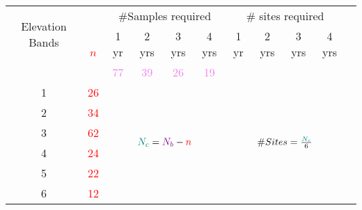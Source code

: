 \begin{table}\scriptsize
\centering
\begin{tabular}{cccccc|ccccc}
\toprule
 \multirow{2}{1cm}{Elevation Bands}  &   &\multicolumn{4}{c|}{ \#Samples required} & \multicolumn{4}{c}{\# sites required} \\ \cline{3-10}\noalign{\smallskip}
\multicolumn{1}{c}{}&\multirow{2}{.3cm}{\textcolor{red}{$n$}}  & 1 yr  & 2 yrs   & 3 yrs    & 4 yrs                   & 1 yr   & 2 yrs  & 3 yrs  & 4 yrs\\ 
						&		           &\textcolor{violet}{77} &\textcolor{violet}{39} &\textcolor{violet}{26} &\textcolor{violet}{19}&&&&&\\ \midrule				
1   &\textcolor{red}{26}&\multicolumn{4}{c|}{\multirow{6}{*}{\large$\textcolor{teal}{N_c}={\textcolor{violet}{N_b} - \textcolor{red}{n}}$}}& \multicolumn{4}{c}{\multirow{6}{*}{\large$\#Sites = {\textcolor{teal}{N_c}\over 6}$}}                                                               \\ 
2     &\textcolor{red}{34}&\multicolumn{4}{c|}{}&\multicolumn{4}{c}{}                                                              \\ 
3    &\textcolor{red}{62}&\multicolumn{4}{c|}{}   &\multicolumn{4}{c}{}                                                                 \\
4     &\textcolor{red}{24}&\multicolumn{4}{c|}{}   &\multicolumn{4}{c}{}                                                             \\ 
5     &\textcolor{red}{22}&\multicolumn{4}{c|}{}    &\multicolumn{4}{c}{}                                                                \\ 
6    &\textcolor{red}{12} &\multicolumn{4}{c|}{}   &\multicolumn{4}{c}{}                                                       \\ \bottomrule
\end{tabular}
\end{table}